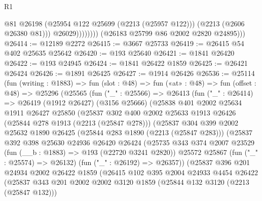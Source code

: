 \begin{lexlean}{R1}
\begin{coremodule}
                          @81
                          @26198
                          (@25954 @122 @25699 (@2213 (@25957 @122)))
                          (@2213 (@2606 @26380 @81)))
                        @26029))))))))
        (@26183 @25799 @86 @2002 @2820 @24895)))
@26414 := @12189 @2272
@26415 := @3667 @25733
@26419 := @26415 @54 @402 @25635 @25642
@26420 := @193 @25640
@26421 := @1841 @26420
@26422 := @193 @24945
@26424 := @1841 @26422 @1859
@26425 := @26421 @26424
@26426 := @1891 @26425
@26427 := @1914 @26426
@26536 := @25114
    (fun (writing : @1883) =>
    fun (slot : @48) =>
    fun («at» : @48) =>
    fun (offset : @48) =>
    @25296
      (@25565
        (fun ("_" : @25566) =>
        @26413
          (fun ("_" : @26414) =>
          @26419
            (@1912 @26427)
            (@3156 @25666)
            (@25838
              @401
              @2002
              @25634
              @1911
              @26427
              @25850
              (@25837
                @302
                @400
                @2002
                @25633
                @1913
                @26426
                (@25844 @278 @1913 (@2213 (@25847 @278)))
                (@25837
                  @304
                  @399
                  @2002
                  @25632
                  @1890
                  @26425
                  (@25844 @283 @1890 (@2213 (@25847 @283)))
                  (@25837
                    @392
                    @398
                    @25630
                    @24936
                    @26420
                    @26424
                    (@25735
                      @343
                      @374
                      @2007
                      @23529
                      (fun (__b : @1883) => @193 (@22720 @3241 @2820))
                      @25572
                      @25867
                      (fun ("_" : @25574) => @26132)
                      (fun ("_" : @26192) => @26357))
                    (@25837
                      @396
                      @201
                      @24934
                      @2002
                      @26422
                      @1859
                      (@26415
                        @102
                        @395
                        @2004
                        @24933
                        @4454
                        @26422
                        (@25837
                          @343
                          @201
                          @2002
                          @2002
                          @3120
                          @1859
                          (@25844 @132 @3120 (@2213 (@25847 @132)))

\end{coremodule}
\end{lexlean}

